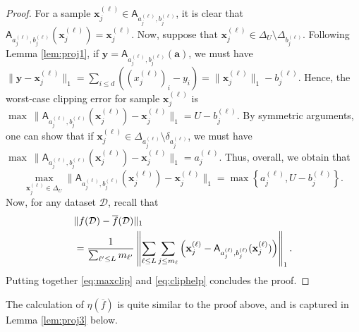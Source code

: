 \begin{proof}
	For a sample $\mathbf{x}_j^{(\ell)}\in \mathsf{A}_{a_j^{(\ell)},b_j^{(\ell)}}$, it is clear that $\mathsf{A}_{a_j^{(\ell)},b_j^{(\ell)}}(\mathbf{x}_j^{(\ell)}) = \mathbf{x}_j^{(\ell)}$. Now, suppose that $\mathbf{x}_j^{(\ell)}\in \Delta_U\setminus \Delta_{b_j^{(\ell)}}$. Following Lemma \ref{lem:proj1}, if $\mathbf{y} = \mathsf{A}_{a_j^{(\ell)},b_j^{(\ell)}}(\mathbf{a})$, we must have $\lVert \mathbf{y} - \mathbf{x}_j^{(\ell)}\rVert_1 = \sum_{i\leq d} ((x_j^{(\ell)})_i - y_i) = \lVert \mathbf{x}_j^{(\ell)}\rVert_1 - b_j^{(\ell)}.$ Hence, the worst-case clipping error for sample $\mathbf{x}_j^{(\ell)}$ is $\max\ \lVert \mathsf{A}_{a_j^{(\ell)},b_j^{(\ell)}}(\mathbf{x}_j^{(\ell)}) - \mathbf{x}_j^{(\ell)}\rVert_1 = U-b_j^{(\ell)}$. By symmetric arguments, one can show that if $\mathbf{x}_j^{(\ell)}\in \Delta_{a_j^{(\ell)}}\setminus \delta_{a_j^{(\ell)}}$, we must have $\max\ \lVert \mathsf{A}_{a_j^{(\ell)},b_j^{(\ell)}}(\mathbf{x}_j^{(\ell)}) - \mathbf{x}_j^{(\ell)}\rVert_1 = a_j^{(\ell)}$. Thus, overall, we obtain that 
	\begin{equation}\max_{\mathbf{x}_j^{(\ell)}\in \Delta_U} \lVert \mathsf{A}_{a_j^{(\ell)},b_j^{(\ell)}}(\mathbf{x}_j^{(\ell)}) - \mathbf{x}_j^{(\ell)}\rVert_1 = \max\left\{a_j^{(\ell)},U-b_j^{(\ell)}\right\}. \label{eq:maxclip}\end{equation} 
	Now, for any dataset $\mathcal{D}$, recall that
	\begin{align}
		&\lVert f(\mathcal{D})-\overline{f}(\mathcal{D})\rVert_1 \notag\\
		&=\frac{1}{\sum_{\ell'\leq L} m_{\ell'}}\left\lVert \sum_{\ell\leq L}\sum_{j\leq m_\ell} \left(\mathbf{x}_j^{(\ell)} - \mathsf{A}_{a_j^{(\ell)},b_j^{(\ell)}}(\mathbf{x}_j^{(\ell)}) \right)\right \rVert_1. \label{eq:cliphelp}
	\end{align}
	Putting together \eqref{eq:maxclip} and \eqref{eq:cliphelp} concludes the proof.
\end{proof}
The calculation of $\eta(\overline{f})$ is quite similar to the proof above, and is captured in Lemma \ref{lem:proj3} below.

